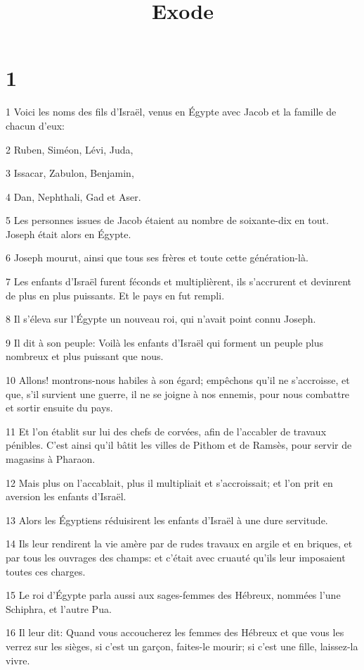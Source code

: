 

\title{Exode}


\chapter{1}

\par 1 Voici les noms des fils d'Israël, venus en Égypte avec Jacob et la famille de chacun d'eux:
\par 2 Ruben, Siméon, Lévi, Juda,
\par 3 Issacar, Zabulon, Benjamin,
\par 4 Dan, Nephthali, Gad et Aser.
\par 5 Les personnes issues de Jacob étaient au nombre de soixante-dix en tout. Joseph était alors en Égypte.
\par 6 Joseph mourut, ainsi que tous ses frères et toute cette génération-là.
\par 7 Les enfants d'Israël furent féconds et multiplièrent, ils s'accrurent et devinrent de plus en plus puissants. Et le pays en fut rempli.
\par 8 Il s'éleva sur l'Égypte un nouveau roi, qui n'avait point connu Joseph.
\par 9 Il dit à son peuple: Voilà les enfants d'Israël qui forment un peuple plus nombreux et plus puissant que nous.
\par 10 Allons! montrons-nous habiles à son égard; empêchons qu'il ne s'accroisse, et que, s'il survient une guerre, il ne se joigne à nos ennemis, pour nous combattre et sortir ensuite du pays.
\par 11 Et l'on établit sur lui des chefs de corvées, afin de l'accabler de travaux pénibles. C'est ainsi qu'il bâtit les villes de Pithom et de Ramsès, pour servir de magasins à Pharaon.
\par 12 Mais plus on l'accablait, plus il multipliait et s'accroissait; et l'on prit en aversion les enfants d'Israël.
\par 13 Alors les Égyptiens réduisirent les enfants d'Israël à une dure servitude.
\par 14 Ils leur rendirent la vie amère par de rudes travaux en argile et en briques, et par tous les ouvrages des champs: et c'était avec cruauté qu'ils leur imposaient toutes ces charges.
\par 15 Le roi d'Égypte parla aussi aux sages-femmes des Hébreux, nommées l'une Schiphra, et l'autre Pua.
\par 16 Il leur dit: Quand vous accoucherez les femmes des Hébreux et que vous les verrez sur les sièges, si c'est un garçon, faites-le mourir; si c'est une fille, laissez-la vivre.

